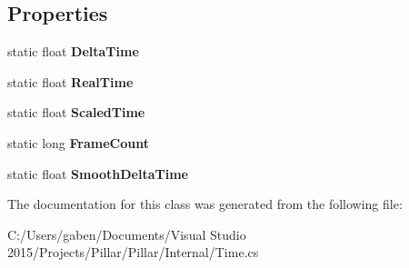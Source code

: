\subsection*{Properties}
\begin{DoxyCompactItemize}
\item 
\mbox{\label{class_pillar3_d_1_1_time_a601a80c9e850076707b071dfa7c08a21}} 
static float {\bfseries Delta\+Time}
\item 
\mbox{\label{class_pillar3_d_1_1_time_a750754af29660f91ec00ac9a9110e85f}} 
static float {\bfseries Real\+Time}
\item 
\mbox{\label{class_pillar3_d_1_1_time_afac9966351eb52070bb2658d3d7c2f84}} 
static float {\bfseries Scaled\+Time}
\item 
\mbox{\label{class_pillar3_d_1_1_time_a73c7fcefe5ebbdbfbb410628d3d1e3a7}} 
static long {\bfseries Frame\+Count}
\item 
\mbox{\label{class_pillar3_d_1_1_time_aebb0c309c86c95ef5e4ec86d99468a5b}} 
static float {\bfseries Smooth\+Delta\+Time}
\end{DoxyCompactItemize}


The documentation for this class was generated from the following file\+:\begin{DoxyCompactItemize}
\item 
C\+:/\+Users/gaben/\+Documents/\+Visual Studio 2015/\+Projects/\+Pillar/\+Pillar/\+Internal/Time.\+cs\end{DoxyCompactItemize}
